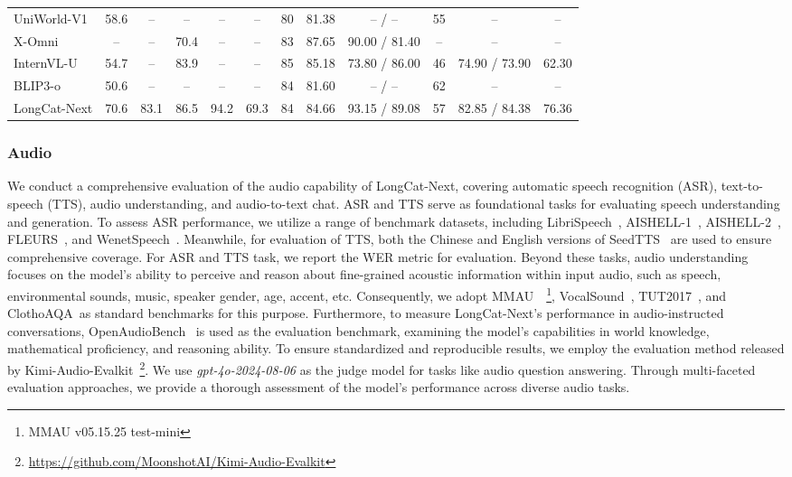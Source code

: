 \begin{table}[t]
{\begin{tabular}{l ccccc | cccccc}
UniWorld-V1\cite{lin2025uniworldv1highresolutionsemanticencoders} &  58.6 & -- & --  & -- & -- & 80 & 81.38 & -- / -- & 55 & -- & -- \\
X-Omni \cite{geng2025xomni}& -- & -- & 70.4  & -- & -- & 83 & 87.65 & 90.00 / 81.40 & -- & -- & -- \\
InternVL-U\cite{tian2026internvludemocratizingunifiedmultimodal} & 54.7  & -- & 83.9 & -- & --  & 85 & 85.18 & 73.80 / 86.00 & 46 & 74.90 / 73.90 & 62.30 \\
BLIP3-o \cite{blip3oNext2025} & 50.6   & -- & -- & -- & -- & 84 & 81.60 & -- / -- & 62 & -- & -- \\
\midrule
LongCat-Next & 70.6 & 83.1 & 86.5  & 94.2 & 69.3 & 84 & 84.66 & 93.15 / 89.08 & 57 & 82.85  / 84.38 & 76.36  \\
\bottomrule
\end{tabular}
}
\end{table}



\subsubsection{Audio}

We conduct a comprehensive evaluation of the audio capability of LongCat-Next, covering automatic speech recognition (ASR), text-to-speech (TTS), audio understanding, and audio-to-text chat.
ASR and TTS serve as foundational tasks for evaluating speech understanding and generation. To assess ASR performance, we utilize a range of benchmark datasets, including LibriSpeech~\cite{panayotov2015librispeech}, AISHELL-1~\cite{bu2017aishell}, AISHELL-2~\cite{du2018aishell}, FLEURS~\cite{conneau2023fleurs}, and WenetSpeech~\cite{zhang2022wenetspeech}. Meanwhile, for evaluation of TTS, both the Chinese and English versions of SeedTTS~\cite{anastassiou2024seed} are used to ensure comprehensive coverage. For ASR and TTS task, we report the WER metric for evaluation.
Beyond these tasks, audio understanding focuses on the model’s ability to perceive and reason about fine-grained acoustic information within input audio, such as speech, environmental sounds, music, speaker gender, age, accent, etc. Consequently, we adopt MMAU~\cite{sakshi2024mmau}~\footnote{MMAU v05.15.25 test-mini}, VocalSound~\cite{gong2022vocalsound}, TUT2017~\cite{mesaros2016tut},  and ClothoAQA~\cite{lipping2022clotho}as standard benchmarks for this purpose. Furthermore, to measure LongCat-Next’s performance in audio-instructed conversations, OpenAudioBench~\cite{li2025baichuan} is used as the evaluation benchmark, examining the model’s capabilities in world knowledge, mathematical proficiency, and reasoning ability. To ensure standardized and reproducible results, we employ the evaluation method released by Kimi-Audio-Evalkit~\footnote{\url{https://github.com/MoonshotAI/Kimi-Audio-Evalkit}}. We use \textit{gpt-4o-2024-08-06} as the judge model for tasks like audio question answering. Through multi-faceted evaluation approaches, we provide a thorough assessment of the model’s performance across diverse audio tasks.

